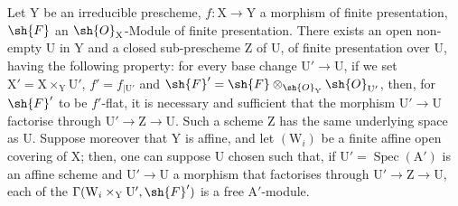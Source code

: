 \begin{proposition}[11.4.5]
\label{IV.11.4.5}
Let $\mathrm{Y}$ be an irreducible prescheme, $f:\mathrm{X}\to\mathrm{Y}$ a morphism of
finite presentation, $\sh{F}$ an $\sh{O}_\mathrm{X}$-Module of finite presentation. There exists an open non-empty $\mathrm{U}$
in $\mathrm{Y}$ and a closed sub-prescheme $\mathrm{Z}$ of $\mathrm{U}$, of finite presentation over $\mathrm{U}$, having the following property:
for every base change $\mathrm{U}'\to\mathrm{U}$, if we set $\mathrm{X}'=\mathrm{X}\times_\mathrm{Y}\mathrm{U}'$, $f'=f_{|\mathrm{U}'}$ and $\sh{F}'=\sh{F}\otimes_{\sh{O}_\mathrm{Y}}\sh{O}_{\mathrm{U}'}$,
then, for $\sh{F}'$ to be $f'$-flat, it is necessary and sufficient that the morphism $\mathrm{U}'\to\mathrm{U}$ factorise
through $\mathrm{U}'\to\mathrm{Z}\to\mathrm{U}$. Such a scheme $\mathrm{Z}$ has the same underlying space as $\mathrm{U}$. Suppose moreover that $\mathrm{Y}$ is affine,
and let $(\mathrm{W}_i)$ be a finite affine open covering of $\mathrm{X}$; then, one can suppose $\mathrm{U}$ chosen
such that, if $\mathrm{U}'=\operatorname{Spec}(\mathrm{A}')$ is an affine scheme and $\mathrm{U}'\to\mathrm{U}$ a morphism that factorises
through $\mathrm{U}'\to\mathrm{Z}\to\mathrm{U}$, each of the $\Gamma(\mathrm{W}_i\times_\mathrm{Y}\mathrm{U}',\sh{F}')$ is a free $\mathrm{A}'$-module.
\end{proposition}

